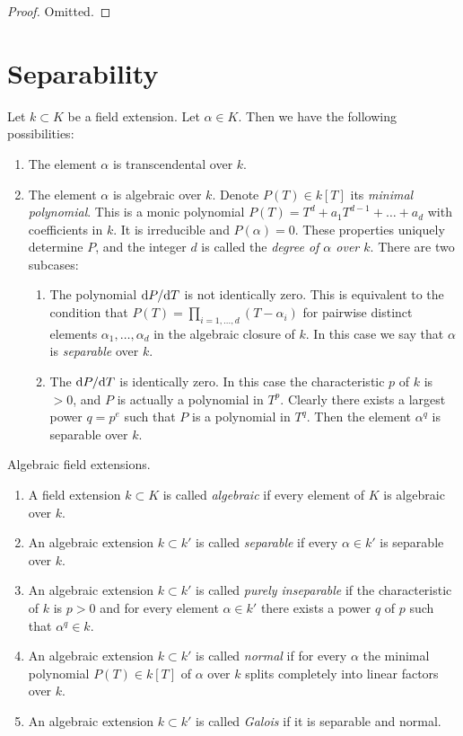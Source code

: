 \begin{proof}
Omitted.
\end{proof}








\section{Separability}
\label{section-separability}

\noindent
Let $k \subset K$ be a field extension. Let $\alpha \in K$.
Then we have the following possibilities:
\begin{enumerate}
\item The element $\alpha$ is transcendental over $k$.
\item The element $\alpha$ is algebraic over $k$. Denote
$P(T) \in k[T]$ its {\it minimal polynomial}. This is a monic polynomial
$P(T) = T^d + a_1 T^{d - 1} + \ldots + a_d$ with coefficients in
$k$. It is irreducible and $P(\alpha) = 0$. These properties
uniquely determine $P$, and the integer $d$ is called the
{\it degree of $\alpha$ over $k$}. There are two subcases:
\begin{enumerate}
\item The polynomial ${\rm d}P/{\rm d}T$ is not identically zero.
This is equivalent to the condition that
$P(T) = \prod_{i = 1, \ldots, d} (T - \alpha_i)$ for
pairwise distinct elements $\alpha_1, \ldots, \alpha_d$
in the algebraic closure of $k$.
In this case we say that $\alpha$ is {\it separable} over $k$.
\item The ${\rm d}P/{\rm d}T$ is identically zero. In this case the
characteristic $p$ of $k$ is $ > 0$, and $P$ is actually a polynomial
in $T^p$. Clearly there exists a largest power $q = p^e$ such that $P$ is
a polynomial in $T^q$. Then the element $\alpha^q$ is separable over $k$.
\end{enumerate}
\end{enumerate}

\begin{definition}
\label{definition-separable-algebraic}
Algebraic field extensions.
\begin{enumerate}
\item A field extension $k \subset K$ is called {\it algebraic}
if every element of $K$ is algebraic over $k$.
\item An algebraic extension $k \subset k'$ is called {\it separable}
if every $\alpha \in k'$ is separable over $k$.
\item An algebraic
extension $k \subset k'$ is called {\it purely inseparable} if
the characteristic of $k$ is $p > 0$ and for every element
$\alpha \in k'$ there exists a power $q$ of $p$ such that
$\alpha^q \in k$.
\item An algebraic extension $k \subset k'$ is called {\it normal}
if for every $\alpha$ the minimal polynomial $P(T) \in k[T]$
of $\alpha$ over $k$ splits completely into linear factors over $k$.
\item An algebraic extension $k \subset k'$ is called {\it Galois}
if it is separable and normal.
\end{enumerate}
\end{definition}

